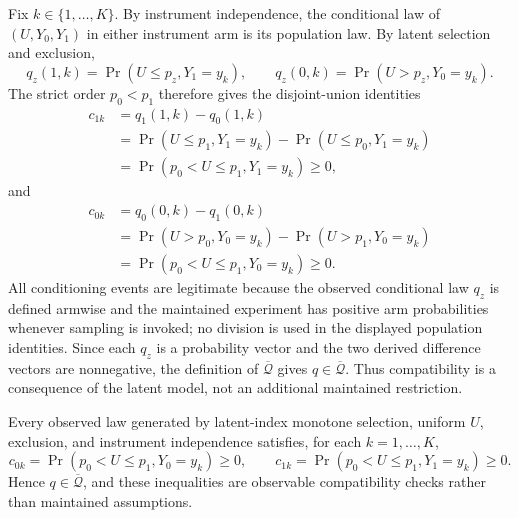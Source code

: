 Fix \(k\in\{1,\ldots,K\}\).  By instrument independence, the conditional law of \((U,Y_0,Y_1)\) in either instrument arm is its population law.  By latent selection and exclusion,
\[
q_z(1,k)=\Pr(U\le p_z,Y_1=y_k),\qquad
q_z(0,k)=\Pr(U>p_z,Y_0=y_k).
\]
The strict order \(p_0<p_1\) therefore gives the disjoint-union identities
\[
\begin{aligned}
c_{1k}
&=q_1(1,k)-q_0(1,k)\\
&=\Pr(U\le p_1,Y_1=y_k)-\Pr(U\le p_0,Y_1=y_k)\\
&=\Pr(p_0<U\le p_1,Y_1=y_k)\ge0,
\end{aligned}
\]
and
\[
\begin{aligned}
c_{0k}
&=q_0(0,k)-q_1(0,k)\\
&=\Pr(U>p_0,Y_0=y_k)-\Pr(U>p_1,Y_0=y_k)\\
&=\Pr(p_0<U\le p_1,Y_0=y_k)\ge0.
\end{aligned}
\]
All conditioning events are legitimate because the observed conditional law \(q_z\) is defined armwise and the maintained experiment has positive arm probabilities whenever sampling is invoked; no division is used in the displayed population identities.  Since each \(q_z\) is a probability vector and the two derived difference vectors are nonnegative, the definition of \(\overline{\mathcal Q}\) gives \(q\in\overline{\mathcal Q}\).  Thus compatibility is a consequence of the latent model, not an additional maintained restriction.

Every observed law generated by latent-index monotone selection, uniform \(U\), exclusion, and instrument independence satisfies, for each \(k=1,\ldots,K\),
\[
c_{0k}=\Pr(p_0<U\le p_1,Y_0=y_k)\ge0,\qquad c_{1k}=\Pr(p_0<U\le p_1,Y_1=y_k)\ge0.
\]
Hence \(q\in\overline{\mathcal Q}\), and these inequalities are observable compatibility checks rather than maintained assumptions.

